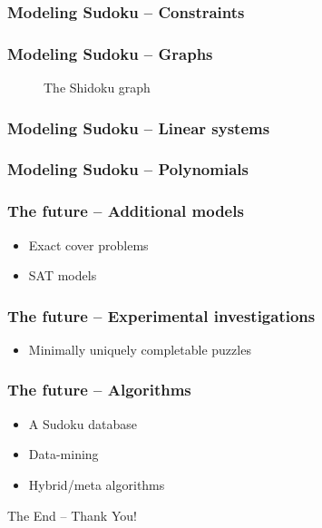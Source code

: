 \documentclass{beamer}
\begin{document}
\begin{frame}
\frametitle{Modeling Sudoku -- Constraints}

\end{frame}

\begin{frame}[fragile]
\frametitle{Modeling Sudoku -- Graphs}
 \begin{figure}[h]
  \centering
  \begin{dot2tex}[circo,mathmode,options={--graphstyle "scale=0.25"}]
   
  \end{dot2tex}
  \caption{The Shidoku graph}
 \end{figure}
\end{frame}

\begin{frame}
\frametitle{Modeling Sudoku -- Linear systems}

\end{frame}

\begin{frame}
\frametitle{Modeling Sudoku -- Polynomials}

\end{frame}

\begin{frame}
\frametitle{The future -- Additional models}
 \begin{itemize}
  \item <1-> Exact cover problems
  \item <2-> SAT models
 \end{itemize}
\end{frame}

\begin{frame}
\frametitle{The future -- Experimental investigations}
 \begin{itemize}
  \item <1-> Minimally uniquely completable puzzles
 \end{itemize}
\end{frame}

\begin{frame}
\frametitle{The future -- Algorithms}
 \begin{itemize}
  \item <1-> A Sudoku database
  \item <2-> Data-mining
  \item <3-> Hybrid/meta algorithms
 \end{itemize}
\end{frame}

\begin{frame}
  The End -- Thank You!
\end{frame}
\end{document}
